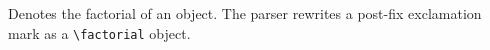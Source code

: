 
Denotes the factorial of an object. The parser rewrites a post-fix
exclamation mark as a \verb|\factorial| object.




